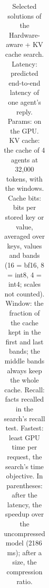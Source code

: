 \documentclass[11pt]{article}
\begin{document}
\begin{table}[!ht]
\begin{tabular}{lcccccccc}
\bottomrule
\end{tabular}
\caption{Selected solutions of the Hardware-aware + KV cache search. Latency: predicted end-to-end latency of one agent's reply. Params: on the GPU. KV cache: the cache of 4 agents at 32{,}000 tokens, with the windows. Cache bits: bits per stored key or value, averaged over keys, values and bands (16 = bf16, 8 = int8, 4 = int4; scales not counted). Window: the fraction of the cache kept in the first and last bands; the middle bands always keep the whole cache. Recall: facts recalled in the search's recall test. Fastest: least GPU time per request, the search's time objective. In parentheses: after the latency, the speedup over the uncompressed model (2186\,ms); after a size, the compression ratio.}
\label{tab:kvmodels}
\end{table}
\end{document}
